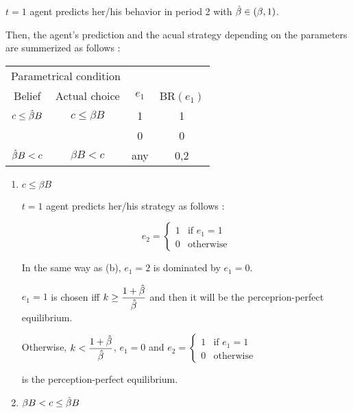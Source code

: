 \documentclass{jsarticle}
\begin{document}
\begin{enumerate}
\begin{enumerate}
\begin{itemize}
 $t=1$ agent predicts her/his behavior in period 2 with $\Hat{\beta} \in (\beta, 1)$.
 
 Then, the agent's prediction and the acual strategy depending on the parameters are summerized as follows :
 
  \begin{center}
  
  \begin{tabular}{cccc} \hline
 \multicolumn{2}{c}{Parametrical condition} & & \\
 \multicolumn{1}{c}{Belief} & \multicolumn{1}{c}{Actual choice} & $e_1$ & BR$(e_1)$ \\ \hline
 $c \leq \Hat{\beta}B$ & $c \leq \beta B$ & 1 & 1 \\
  & & 0 & 0 \\
 $\Hat{\beta} B < c $ & $\beta B <c$ & any & 0,2 \\ \hline
  \end{tabular}
  
  \end{center}
  
  \vspace{1zw}
 
 \end{itemize}

 \begin{enumerate}
 
 \item $c \leq \beta B$
 
 $t=1$ agent predicts her/his strategy as follows :
 
 \[e_2 = \begin{cases}
 1 & \text{if } e_1=1 \\
 0 & \text{otherwise}
 \end{cases} \]
 
 In the same way as (b), $e_1=2$ is dominated by $e_1=0$.
 
 $e_1=1$ is chosen iff $ k \geq \dfrac{1+\Hat{\beta}}{\Hat{\beta}}$ and then it will be the perceprion-perfect equilibrium.
 
 Otherwise, $ k < \dfrac{1+\Hat{\beta}}{\Hat{\beta}}$, $e_1=0$ and $e_2 = \begin{cases}
 1 & \text{if } e_1=1 \\
 0 & \text{otherwise}
 \end{cases} $
 
 is the perception-perfect equilibrium.
 
 \item $\beta B < c \leq \Hat{\beta} B$
 

\end{enumerate}
\end{enumerate}
\end{enumerate}
\end{document}
